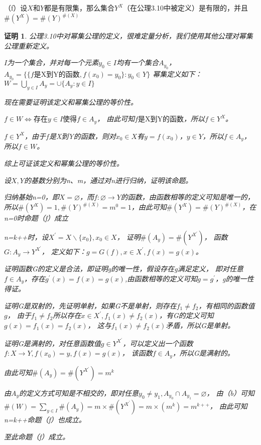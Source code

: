 \documentclass{article}
\theoremstyle{mystyle}
\theoremstyle{zproofstyle}
\newtheorem*{zproof}{证明}
\begin{document}
（f）设$X$和$Y$都是有限集，那么集合$Y^X$（在公理3.10中被定义）是有限的，并且$\#(Y^X)=\#(Y)^{\#(X)}$
\begin{zproof}
  公理3.10中对幂集公理的定义，很难定量分析，我们使用其他公理对幂集公理重新定义。


  $I$为一个集合，并对每一个元素$y_0 \in I$均有一个集合$A_{y_0}$，
  $A_{y_0} = \{ \{f\text{是X到Y的函数}, f(x_0)=y_0\}: y_0 \in Y\}$
  幂集定义如下：
  $W=\bigcup\limits_{y \in I}A_{y} = \cup\{A_y : y \in I\}$

  现在需要证明该定义和幂集公理的等价性。

  $f \in W \Leftrightarrow \text{存在} y \in I \text{使得} f \in A_y$，
  由此可知$f\text{是X到Y的函数}$，所以$f \in Y^X$。

  $f \in Y^X$，由于$f$是X到Y的函数，则对$x_0 \in X$有$y=f(x_0)$，$y \in Y$，所以$f \in A_y$，
  所以$f \in W$。

  综上可证该定义和幂集公理的等价性。


  设$X,Y$的基数分别为n、m，通过对n进行归纳，证明该命题。

  归纳基始n=0，即$X = \varnothing$，而$f: \varnothing \rightarrow Y$的函数，由函数相等的定义可知是唯一的，
  所以$\#(Y^X)=1,\#(Y)^{\#(X)}=m^0=1$，由此可知$\#(Y^X)=\#(Y)^{\#(X)}$，在n=0时命题（f）成立

  n=k++时，设$X^\prime=X \backslash \{x_0\}, x_0 \in X$，
  证明$\#(A_y)=\#(Y^{X^\prime})$，
  函数$G: A_y \rightarrow Y^{X^\prime}$，
  定义如下：$ g=G(f), x \in X^\prime, f(x)=g(x)$。

  证明函数G的定义是合法，即证明g的唯一性，假设存在g满足定义，
  即对任意$f \in A_y$，存在$g^\prime(x)=f(x)=g(x)$,由函数相等的定义可知$g=g^\prime$，g的唯一性得证。

  证明G是双射的，先证明单射，如果G不是单射，则存在$f_1 \neq f_2$，有相同的函数值$g$，
  由于$f_1 \neq f_2$所以存在$x \in X^\prime, f_1(x) \neq f_2(x)$，有G的定义可知$g(x)=f_1(x)=f_2(x)$，
  这与$f_1(x) \neq f_2(x)$矛盾，所以G是单射。

  证明G是满射的，对任意函数值$g \in Y^{X^\prime}$，可以定义出一个函数$f: X \rightarrow Y, f(x_0)=y, f(x)=g(x)$，
  该函数$f \in A_y$，所以G是满射的。

  由此可知$\#(A_y)=\#(Y^{X^\prime})=m^k$

  由$A_y$的定义方式可知是不相交的，即对任意$y_0 \neq y_1, A_{y_0} \cap A_{y_1}=\varnothing$，
  由（b）可知$\#(W)=\sum_{y \in I} \#(A_y) = m \times \#(Y^{X^\prime}) = m \times (m^k) = m^{k++} $，
  由此可知n=k++命题（f）也成立。

  至此命题（f）成立。
\end{zproof}
\end{document}
